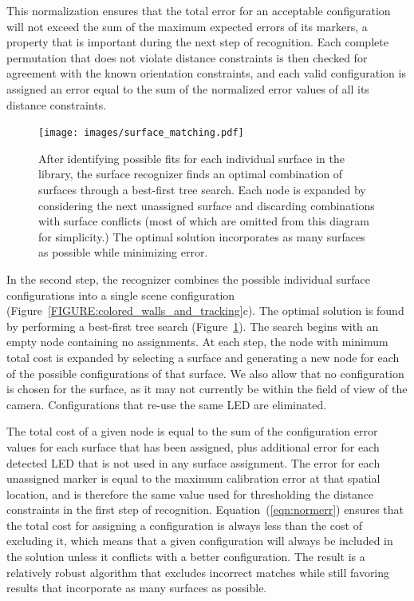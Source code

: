 \documentclass{thesis}
\begin{document}
This normalization ensures that the total error for an acceptable
configuration will not exceed the sum of the maximum expected
errors of its markers, a property that is important during
the next step of recognition.  Each complete permutation that does not
violate distance constraints is then checked for agreement with the
known orientation constraints, and each valid configuration is
assigned an error equal to the sum of the normalized error values of
all its distance constraints.

\begin{figure}[t]
\texttt{[image: images/surface\_matching.pdf]}
\caption[Optimal Surface Configuration Search]{ After identifying possible fits for each individual surface in the library, the surface recognizer finds an optimal combination of surfaces through a best-first tree search. Each node is expanded by considering the next unassigned surface and discarding combinations with surface conflicts (most of which are omitted from this diagram for simplicity.) The optimal solution incorporates as many surfaces as possible while minimizing error.}
\label{FIGURE:TreeSearch}
\end{figure}

In the second step, the recognizer combines the possible individual
surface configurations into a single scene configuration
(Figure~\ref{FIGURE:colored_walls_and_tracking}c). The optimal
solution is found by performing a best-first tree search (Figure~\ref{FIGURE:TreeSearch}). The search
begins with an empty node containing no assignments. At each step, the
node with minimum total cost is expanded by selecting a surface and
generating a new node for each of the possible configurations of that
surface.  We also allow that no configuration is chosen for the
surface, as it may not currently be within the field of view of the
camera.  Configurations that re-use the same LED are eliminated. 

The total cost of a given node is equal to the sum of the configuration error values for each surface that has been assigned, plus additional error for each detected LED that is not used in any surface assignment.  The error for each unassigned marker is equal to the maximum calibration error at that spatial location, and is therefore the same value used for thresholding the distance constraints in the first step of recognition.  Equation~(\ref{eqn:normerr}) ensures that the total cost for assigning a configuration is always less than the cost of excluding it, which means that a given configuration will always be included in the solution unless it conflicts with a better configuration. The result is a relatively robust algorithm that excludes incorrect matches while still favoring results that incorporate as many surfaces as possible. 
\end{document}
